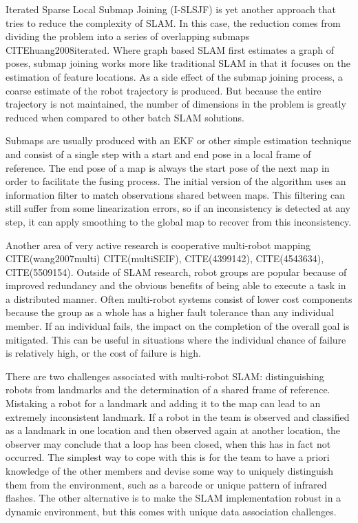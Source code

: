 \documentclass[12pt]{report}
\begin{document}
Iterated Sparse Local Submap Joining (I-SLSJF) is yet another approach that tries to reduce the complexity of SLAM.  In this case, the reduction comes from dividing the problem into a series of overlapping submaps  CITE{huang2008iterated}.  Where graph based SLAM first estimates a graph of poses, submap joining works more like traditional SLAM in that it focuses on the estimation of feature locations.  As a side effect of the submap joining process, a coarse estimate of the robot trajectory is produced.  But because the entire trajectory is not maintained, the number of dimensions in the problem is greatly reduced when compared to other batch SLAM solutions.

Submaps are usually produced with an EKF or other simple estimation technique and consist of a single step with a start and end pose in a local frame of reference.  The end pose of a map is always the start pose of the next map in order to facilitate the fusing process.  The initial version of the algorithm uses an information filter to match observations shared between maps.  This filtering can still suffer from some linearization errors, so if an inconsistency is detected at any step, it can apply smoothing to the global map to recover from this inconsistency.  

Another area of very active research is cooperative multi-robot mapping 
CITE(wang2007multi) CITE(multiSEIF), CITE(4399142), CITE(4543634), CITE(5509154).  
Outside of SLAM research, robot groups are popular because of improved redundancy and the obvious benefits of being able to execute a task in a distributed manner.  Often multi-robot systems consist of lower cost components because the group as a whole has a higher fault tolerance than any individual member.  If an individual fails, the impact on the completion of the overall goal is mitigated.   This can be useful in situations where the individual chance of failure is relatively high, or the cost of failure is high.  

There are two challenges associated with multi-robot SLAM: distinguishing robots from landmarks and the determination of a shared frame of reference.  Mistaking a robot for a landmark and adding it to the map can lead to an extremely inconsistent landmark.  If a robot in the team is observed and classified as a landmark in one location and then observed again at another location, the observer may conclude that a loop has been closed, when this has in fact not occurred.  The simplest way to cope with this is for the team to have a priori knowledge of the other members and devise some way to uniquely distinguish them from the environment, such as a barcode or unique pattern of infrared flashes.  The other alternative is to make the SLAM implementation robust in a dynamic environment, but this comes with unique data association challenges.
\end{document}
